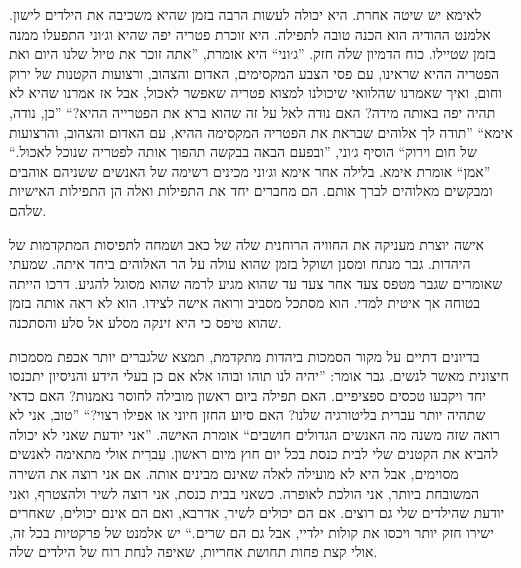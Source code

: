 \documentclass[14pt, article, extrafontsizes, twopage, a4paper]{memoir}
\begin{document}
לאימא יש שיטה אחרת. היא יכולה לעשות הרבה בזמן שהיא משכיבה את הילדים לישון. אלמנט ההודיה הוא
הכנה טובה לתפילה. היא זוכרת פטריה יפה
שהיא וג׳וני התפעלו ממנה בזמן שטיילו.
כוח הדמיון שלה חזק. ''ג׳וני`` היא
אומרת, ''אתה זוכר את טיול שלנו היום ואת הפטריה ההיא
שראינו, עם פסי הצבע המקסימים, האדום והצהוב,
ורצועות הקטנות של ירוק וחום, ואיך שאמרנו
שהלוואי שיכולנו למצוא פטריה שאפשר לאכול, אבל אז אמרנו
שהיא לא תהיה יפה באותה מידה? האם נודה לאל
על זה שהוא ברא את הפטרייה ההיא?“ ''כן, נודה,  אימא`` ''תודה לך
אלוהים שבראת את הפטריה המקסימה ההיא, עם האדום והצהוב,
והרצועות של חום וירוק``  הוסיף ג׳וני, ''ובפעם
הבאה בבקשה תהפוך אותה לפטריה שנוכל לאכול.`` ''אמן``
אומרת  אימא. בלילה אחר  אימא וג׳וני
מכינים רשימה של האנשים ששניהם אוהבים ומבקשים מאלוהים
לברך אותם. הם מחברים יחד את התפילות ואלה הן
התפילות האישיות שלהם.

אישה יוצרת מעניקה את החוויה הרוחנית שלה של
כאב ושמחה לתפיסות המתקדמות של היהדות.
גבר מנתח ומסנן ושוקל בזמן שהוא
עולה על הר האלוהים ביחד איתה. שמעתי שאומרים שגבר
מטפס צעד אחר צעד עד שהוא מגיע לרמה שהוא מסוגל
להגיע. דרכו הייתה בטוחה אך איטית למדי. הוא מסתכל
מסביב ורואה אישה לצידו. הוא לא ראה אותה
בזמן שהוא טיפס כי היא זינקה מסלע אל סלע והסתכנה.

בדיונים דתיים על מקור הסמכות
ביהדות מתקדמת, תמצא שלגברים יותר אכפת
מסמכות חיצונית מאשר לנשים. גבר אומר: ”יהיה לנו
תוהו ובוהו אלא אם כן בעלי הידע והניסיון יתכנסו
יחד ויקבעו טכסים ספציפיים. האם תפילה ביום ראשון
מובילה לחוסר נאמנות? האם כדאי שתהיה יותר עברית
בליטורגיה שלנו? האם סיוע החזן חיוני או
אפילו רצוי?“ ”טוב, אני לא רואה שזה משנה מה
האנשים הגדולים חושבים“ אומרת האישה. ”אני יודעת שאני לא יכולה להביא
את הקטנים שלי לבית כנסת בכל יום חוץ מיום ראשון. עִברִית
אולי מתאימה לאנשים מסוימים, אבל היא לא מועילה
לאלה שאינם מבינים אותה. אם אני רוצה את השירה המשובחת ביותר,
אני הולכת לאופרה. כשאני בבית כנסת, אני רוצה
לשיר ולהצטרף, ואני יודעת שהילדים שלי גם רוצים. אם הם
יכולים לשיר, אדרבא, ואם הם אינם יכולים, שאחרים
ישירו חזק יותר ויכסו את קולות ילדיי, אבל גם הם
שרים.“ יש אלמנט של פרקטיות בכל
זה, אולי קצת פחות תחושת אחריות, שאיפה
לנחת רוח של הילדים שלה.
\end{document}
